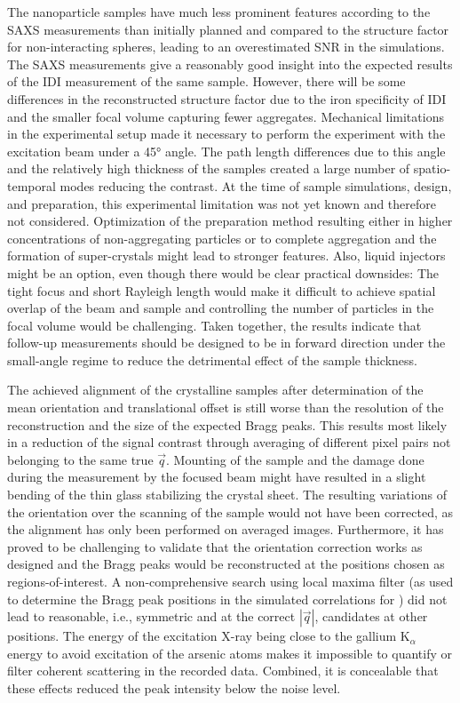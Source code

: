 The nanoparticle samples have much less prominent features according to the SAXS measurements than initially planned and compared to the structure factor for non-interacting spheres, leading to an overestimated SNR in the simulations. The SAXS measurements give a reasonably good insight into the expected results of the IDI measurement of the same sample. However, there will be some differences in the reconstructed structure factor due to the iron specificity of IDI and the smaller focal volume capturing fewer aggregates. Mechanical limitations in the experimental setup made it necessary to perform the experiment with the excitation beam under a 45° angle. The path length differences due to this angle and the relatively high thickness of the samples created a large number of spatio-temporal modes reducing the contrast. At the time of sample simulations, design, and preparation, this experimental limitation was not yet known and therefore not considered.
Optimization of the preparation method resulting either in higher concentrations of non-aggregating particles or to complete aggregation and the formation of super-crystals might lead to stronger features. Also, liquid injectors might be an option, even though there would be clear practical downsides: The tight focus and short Rayleigh length would make it difficult to achieve spatial overlap of the beam and sample and controlling the number of particles in the focal volume would be challenging. 
Taken together, the results indicate that follow-up measurements should be designed to be in forward direction under the small-angle regime to reduce the detrimental effect of the sample thickness.

The achieved alignment of the crystalline samples after determination of the mean orientation and translational offset is still worse than the resolution of the reconstruction and the size of the expected Bragg peaks. This results most likely in a reduction of the signal contrast through averaging of different pixel pairs not belonging to the same true $\vec{q}$. Mounting of the sample and the damage done during the measurement by the focused beam might have resulted in a slight bending of the thin glass stabilizing the crystal sheet. The resulting variations of the orientation over the scanning of the sample would not have been corrected, as the alignment has only been performed on averaged images.  Furthermore, it has proved to be challenging to validate that the orientation correction works as designed and the Bragg peaks would be reconstructed at the positions chosen as regions-of-interest. A non-comprehensive search using local maxima filter (as used to determine the Bragg peak positions in the simulated correlations for ) did not lead to reasonable, i.e., symmetric and at the correct $\left|\vec{q}\right|$, candidates at other positions.
The energy of the excitation X-ray being close to the gallium K$_\alpha$ energy to avoid excitation of the arsenic atoms makes it impossible to quantify or filter coherent scattering in the recorded data. Combined, it is concealable that these effects reduced the peak intensity below the noise level. 

